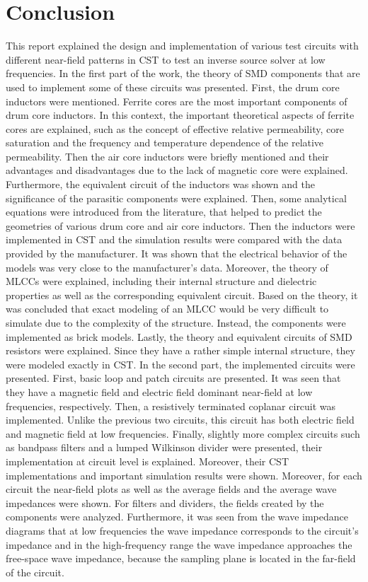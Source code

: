 \chapter{Conclusion} \label{chap:four}
This report explained the design and implementation of various test circuits with different near-field patterns in CST to test an inverse source solver at low frequencies. In the first part of the work, the theory of SMD components that are used to implement some of these circuits was presented. First, the drum core inductors were mentioned. Ferrite cores are the most important components of drum core inductors. In this context, the important theoretical aspects of ferrite cores are explained, such as the concept of effective relative permeability, core saturation and the frequency and temperature dependence of the relative permeability. Then the air core inductors were briefly mentioned and their advantages and disadvantages due to the lack of magnetic core were explained. Furthermore, the equivalent circuit of the inductors was shown and the significance of the parasitic components were explained. Then, some analytical equations were introduced from the literature, that helped to predict the geometries of various drum core and air core inductors. Then the inductors were implemented in CST and the simulation results were compared with the data provided by the manufacturer. It was shown that the electrical behavior of the models was very close to the manufacturer's data. Moreover, the theory of MLCCs were explained, including their internal structure and dielectric properties as well as the corresponding equivalent circuit. Based on the theory, it was concluded that exact modeling of an MLCC would be very difficult to simulate due to the complexity of the structure. Instead, the components were implemented as brick models. Lastly, the theory and equivalent circuits of SMD resistors were explained. Since they have a rather simple internal structure, they were modeled exactly in CST. In the second part, the implemented circuits were presented. First, basic loop and patch circuits are presented. It was seen that they have a magnetic field and electric field dominant near-field at low frequencies, respectively. Then, a resistively terminated coplanar circuit was implemented. Unlike the previous two circuits, this circuit has both electric field and magnetic field at low frequencies. Finally, slightly more complex circuits such as bandpass filters and a lumped Wilkinson divider were presented, their implementation at circuit level is explained. Moreover, their CST implementations and important simulation results were shown. Moreover, for each circuit the near-field plots as well as the average fields and the average wave impedances were shown. For filters and dividers, the fields created by the components were analyzed. Furthermore, it was seen from the wave impedance diagrams that at low frequencies the wave impedance corresponds to the circuit's impedance and in the high-frequency range the wave impedance approaches the free-space wave impedance, because the sampling plane is located in the far-field of the circuit.